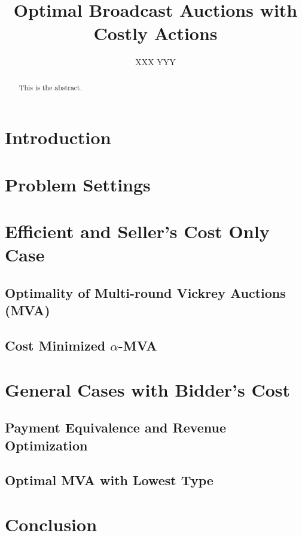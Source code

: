 \documentclass{aamas2012}
\begin{document}
\title{Optimal Broadcast Auctions with Costly Actions}


\author{
\alignauthor
XXX
\alignauthor
YYY
}


\maketitle

\begin{abstract}
This is the abstract.
\end{abstract}

\section{Introduction}

\section{Problem Settings}

\section{Efficient and Seller's Cost Only Case}

\subsection{Optimality of Multi-round Vickrey Auctions (MVA)}

\subsection{Cost Minimized $\alpha$-MVA}

\section{General Cases with Bidder's Cost}

\subsection{Payment Equivalence and Revenue Optimization}

\subsection{Optimal MVA with Lowest Type}

\section{Conclusion}
\end{document}
